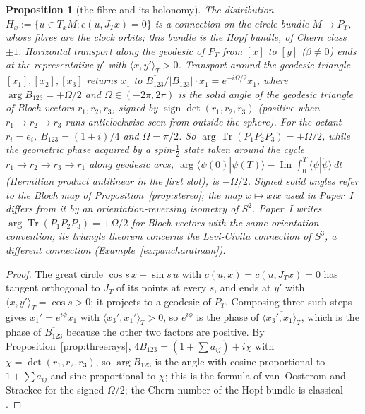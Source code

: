 \documentclass[aps,pra,onecolumn,superscriptaddress,nofootinbib,10pt]{revtex4-2}
\newtheorem{proposition}[theorem]{Proposition}
\theoremstyle{definition}
\theoremstyle{remark}
\newcommand{\im}{\operatorname{Im}}
\newcommand{\ip}[2]{\langle #1,#2\rangle}
\begin{document}
\begin{proposition}[the fibre and its holonomy]\label{prop:holonomy}
The distribution $H_x:=\{u\in T_xM:c(u,J_Tx)=0\}$ is a connection on the circle bundle $M\to P_T$,
whose fibres are the clock orbits; this bundle is the Hopf bundle, of Chern class $\pm1$.  Horizontal
transport along the geodesic of $P_T$ from $[x]$ to $[y]$ ($\beta\ne0$) ends at the representative $y'$ with
$\ip{x}{y'}_T>0$.  Transport around the geodesic triangle $[x_1],[x_2],[x_3]$ returns $x_1$ to
$\overline{B_{123}}/\lvert B_{123}\rvert\cdot x_1=e^{-i\Omega/2}x_1$, where $\arg B_{123}=+\Omega/2$ and $\Omega\in(-2\pi,2\pi)$ is the solid
angle of the geodesic triangle of Bloch vectors $r_1,r_2,r_3$, signed by $\operatorname{sign}\det(r_1,r_2,r_3)$
(positive when $r_1\to r_2\to r_3$ runs anticlockwise seen from outside the sphere).  For the octant
$r_i=e_i$, $B_{123}=(1+i)/4$ and $\Omega=\pi/2$.  So $\arg\operatorname{Tr}(P_1P_2P_3)=+\Omega/2$, while the geometric phase acquired by a spin-$\tfrac12$ state taken around
the cycle $r_1\to r_2\to r_3\to r_1$ along geodesic arcs, $\arg\langle\psi(0)|\psi(T)\rangle-\im\int_0^T\langle\psi|\dot\psi\rangle\,dt$ (Hermitian product antilinear in the first slot), is $-\Omega/2$.
Signed solid angles refer to the Bloch map of Proposition~\ref{prop:stereo}; the map $x\mapsto xi\bar x$ used in
Paper~I differs from it by an orientation-reversing isometry of $S^2$.  Paper~I writes
$\arg\operatorname{Tr}(P_1P_2P_3)=+\Omega/2$ for Bloch vectors with the same orientation convention; its triangle theorem
\cite[Thm.~9.9]{PaperI} concerns the Levi-Civita connection of $S^3$, a different connection
(Example~\ref{ex:pancharatnam}).
\end{proposition}
\begin{proof}
The great circle $\cos s\,x+\sin s\,u$ with $c(u,x)=c(u,J_Tx)=0$ has tangent orthogonal to $J_T$ of its
points at every $s$, and ends at $y'$ with $\ip{x}{y'}_T=\cos s>0$; it projects to a geodesic of $P_T$.
Composing three such steps gives $x_1'=e^{i\phi}x_1$ with $\ip{x_3'}{x_1'}_T>0$, so $e^{i\phi}$ is the phase
of $\overline{\ip{x_3'}{x_1}_T}$, which is the phase of $\overline{B_{123}}$ because the other two factors are
positive.  By Proposition~\ref{prop:threerays}, $4B_{123}=(1+\sum a_{ij})+i\chi$ with $\chi=\det(r_1,r_2,r_3)$, so $\arg B_{123}$ is
the angle with cosine proportional to $1+\sum a_{ij}$ and sine proportional to $\chi$; this is the formula
of van~Oosterom and Strackee \cite{VOS} for the signed $\Omega/2$; the Chern number of the Hopf bundle is
classical \cite{Hopf}.
\end{proof}
\end{document}
